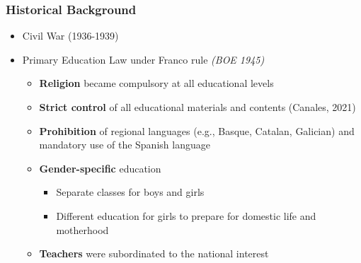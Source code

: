 \documentclass[aspectratio=169]{beamer}
\begin{document}
\begin{frame}
\frametitle{Historical Background}
\begin{itemize}
\item Civil War (1936-1939)
\medskip\pause
\item Primary Education Law under Franco rule \textit{(BOE 1945)}
\medskip\pause
    \begin{itemize}
    \item \textbf{Religion} became compulsory at all educational levels
    \medskip\pause
    \item \textbf{Strict control} of all educational materials and contents (Canales, 2021)
    \medskip\pause
    \item  \textbf{Prohibition} of regional languages (e.g., Basque, Catalan, Galician) and mandatory use of the Spanish language
    \medskip\pause
    \item \textbf{Gender-specific} education
        \medskip
    \begin{itemize}
    \item Separate classes for boys and girls
    \medskip
     \item Different education for girls to prepare for domestic life and motherhood
\end{itemize}\pause
        \medskip
     \item \textbf{Teachers} were subordinated to the national interest
       \medskip
    \end{itemize}
\end{itemize}
\end{frame}
\end{document}
